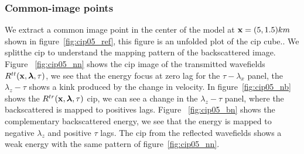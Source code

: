 \subsubsection{Common-image points}

We extract a common image point in the center of the model at ${\bf x}=(5,1.5)km$ shown in figure~\ref{fig:cip05_ref}, this figure 
is an unfolded plot of the cip cube.. We splitthe cip to understand the mapping pattern of the backscattered image. Figure
~\ref{fig:cip05_nn} shows the cip image of the transmitted wavefields $R^{tt}({\bf x},{\boldsymbol{\lambda}},\tau)$, we see that the energy focus at zero lag 
for the $\tau-\lambda_x$ panel, the $\lambda_z-\tau$ shows a kink produced by the change in velocity. In figure~\ref{fig:cip05_nb}
 shows the $R^{tr}({\bf x},{\boldsymbol{\lambda}},\tau)$ cip, we can see a change in the $\lambda_z-\tau$ panel, where the backscattered is mapped to positives lags. Figure
~\ref{fig:cip05_bn} shows the complementary backscattered energy, we see that the energy is mapped to negative $\lambda_z$ and positive $\tau$ lags.
The cip from the reflected wavefields shows a weak energy with the same pattern of figure~\ref{fig:cip05_nn}.
  
